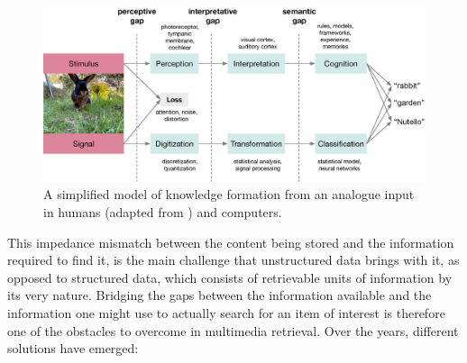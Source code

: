 \begin{figure}[tb]
    \centering
    \includegraphics[width=\textwidth]{figures/gaps.eps}
    \caption{A simplified model of knowledge formation from an analogue input in humans (adapted from \cite{Javanmardi:2021Exploring}) and computers.}
    \label{figure:knowledge_formation}
\end{figure}

This impedance mismatch between the content being stored and the information required to find it, is the main challenge that unstructured data brings with it, as opposed to structured data, which consists of retrievable units of information by its very nature. Bridging the gaps between the information available and the information one might use to actually search for an item of interest is therefore one of the obstacles to overcome in multimedia retrieval. Over the years, different solutions have emerged:

